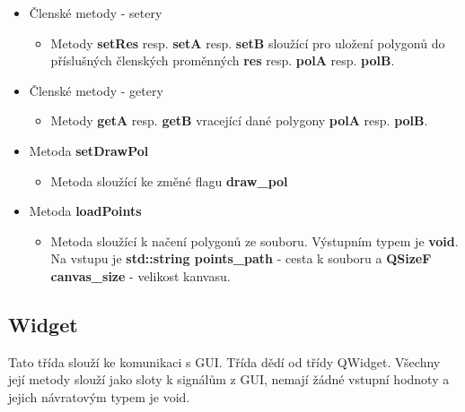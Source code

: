 \documentclass[a4paper, 12pt]{article}
\begin{document}
\begin{itemize}
	\item Členské metody - setery
		\begin{itemize}
			 \item Metody \textbf{setRes} resp. \textbf{setA} resp. \textbf{setB} sloužící pro uložení polygonů do příslušných členských proměnných \textbf{res} resp. \textbf{polA} resp. \textbf{polB}.
		\end{itemize}
	\item Členské metody - getery
		\begin{itemize}
			\item Metody \textbf{getA} resp. \textbf{getB} vracející dané polygony \textbf{polA} resp. \textbf{polB}.
		\end{itemize}
	\item Metoda \textbf{setDrawPol}
		\begin{itemize}
			\item Metoda sloužící ke změné flagu \textbf{draw\_pol}
		\end{itemize}
	\item Metoda \textbf{loadPoints}
		\begin{itemize}
			\item Metoda sloužící k načení polygonů ze souboru. Výstupním typem je \textbf{void}. Na vstupu je \textbf{std::string points\_path} - cesta k souboru a \textbf{QSizeF canvas\_size} - velikost kanvasu.
		\end{itemize}
\end{itemize}


\subsection{Widget}
Tato třída slouží ke komunikaci s GUI. Třída dědí od třídy QWidget. Všechny její metody slouží jako sloty k signálům z GUI, nemají žádné vstupní hodnoty a jejich návratovým typem je void. 
\end{document}
